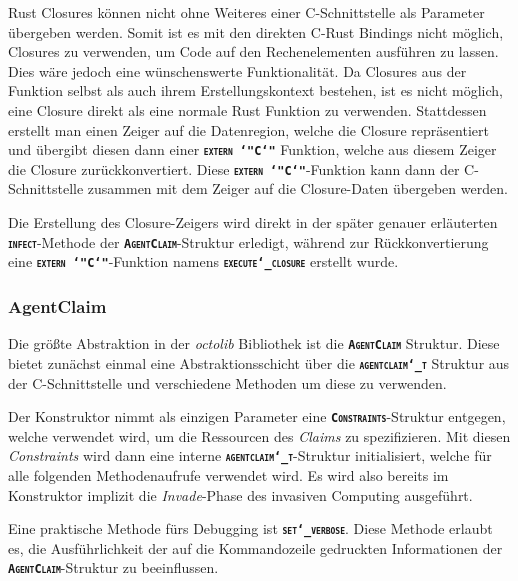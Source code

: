 Rust Closures können nicht ohne Weiteres einer C-Schnittstelle als Parameter übergeben werden.
Somit ist es mit den direkten C-Rust Bindings nicht möglich, Closures zu verwenden,
um Code auf den Rechenelementen ausführen zu lassen. Dies wäre jedoch eine
wünschenswerte Funktionalität. Da Closures aus der Funktion selbst als auch ihrem
Erstellungskontext bestehen\cite{embeddedRustOS}, ist es nicht möglich,
eine Closure direkt als eine normale Rust Funktion zu verwenden.
Stattdessen erstellt man einen Zeiger auf die Datenregion,
welche die Closure repräsentiert und übergibt diesen dann einer
\texttt{\textsc{\textbf{extern \char`"C\char`"}}} Funktion, welche aus diesem Zeiger die Closure zurückkonvertiert.
Diese \texttt{\textsc{\textbf{extern \char`"C\char`"}}}-Funktion kann dann der C-Schnittstelle zusammen mit dem
Zeiger auf die Closure-Daten übergeben werden.

Die Erstellung des Closure-Zeigers wird direkt in der später genauer erläuterten
\texttt{\textsc{\textbf{infect}}}-Methode der \texttt{\textsc{\textbf{AgentClaim}}}-Struktur
erledigt, während zur Rückkonvertierung eine \texttt{\textsc{\textbf{extern \char`"C\char`"}}}-Funktion namens \texttt{\textsc{\textbf{execute\char`_closure}}} erstellt wurde.

\subsubsection{AgentClaim}

Die größte Abstraktion in der \textit{octolib} Bibliothek ist die \texttt{\textsc{\textbf{AgentClaim}}} Struktur.
Diese bietet zunächst einmal eine Abstraktionsschicht über die \texttt{\textsc{\textbf{agentclaim\char`_t}}}
Struktur aus der C-Schnittstelle und verschiedene Methoden um diese zu verwenden.

Der Konstruktor nimmt als einzigen Parameter eine \texttt{\textsc{\textbf{Constraints}}}-Struktur entgegen,
welche verwendet wird, um die Ressourcen des \textit{Claims} zu spezifizieren.
Mit diesen \textit{Constraints} wird dann eine interne
\texttt{\textsc{\textbf{agentclaim\char`_t}}}-Struktur initialisiert,
welche für alle folgenden Methodenaufrufe verwendet wird. Es wird also bereits im Konstruktor implizit die
\textit{Invade}-Phase des invasiven Computing ausgeführt.

Eine praktische Methode fürs Debugging ist \texttt{\textsc{\textbf{set\char`_verbose}}}.
Diese Methode erlaubt es, die Ausführlichkeit der auf die Kommandozeile gedruckten Informationen der
\texttt{\textsc{\textbf{AgentClaim}}}-Struktur zu beeinflussen.

